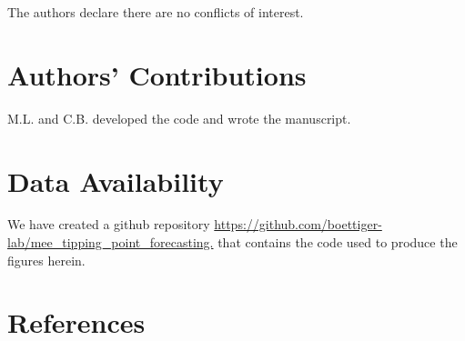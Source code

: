 \documentclass{article}
\begin{document}
The authors declare there are no conflicts of interest.

\hypertarget{authors-contributions}{%
\section*{Authors' Contributions}\label{authors-contributions}}

M.L. and C.B. developed the code and wrote the manuscript.

\hypertarget{data-availability}{%
\section*{Data Availability}\label{data-availability}}

We have created a github repository
\url{https://github.com/boettiger-lab/mee_tipping_point_forecasting.}
that contains the code used to produce the figures herein.

\newpage

\hypertarget{references}{%
\section*{References}\label{references}}
\end{document}
